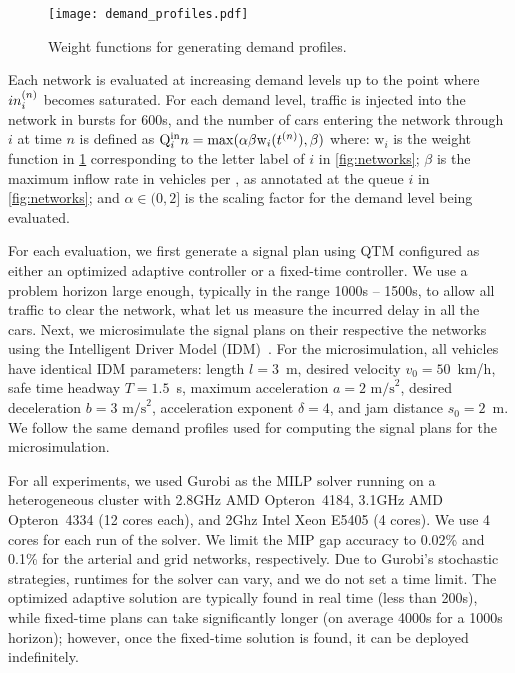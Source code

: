 \begin{figure}[t]
\centering
\texttt{[image: demand\_profiles.pdf]}
\caption{Weight functions for generating demand profiles.}
\label{fig:demand_profiles}
\end{figure}


%
%
Each network is evaluated at increasing demand levels up to the point where
$\inq{i}$ becomes saturated.
%
%
For each demand level, traffic is injected into the network in bursts for 600s,
and the number of cars entering the network through $i$ at time $n$ is defined
as $\QIN{i}{n} = \mathrm{max}(\alpha \beta \mathrm{w}_i(\tn[n]),\beta)$ where:
%
$\mathrm{w}_i$ is the weight function in \cref{fig:demand_profiles}
corresponding to the letter label of $i$ in \cref{fig:networks};
%
$\beta$ is the maximum inflow rate in vehicles per \DT, as annotated at the
queue $i$ in \cref{fig:networks}; and
%
$\alpha \in (0,2]$ is the scaling factor for the demand level being evaluated.


For each evaluation, we first generate a signal plan using QTM configured as
either an optimized adaptive controller or a fixed-time controller.
%
We use a problem horizon \TMAX large enough, typically in the range 1000s --
1500s, to allow all traffic to clear the network, what let us measure the
incurred delay in all the cars.
%
Next, we microsimulate the signal plans on their respective the networks using
the Intelligent Driver Model (IDM)~\cite{treiber2000congested}.
%
For the microsimulation, all vehicles have identical IDM parameters: length
$l=3$~m, desired velocity $v_0 = 50$~km/h, safe time headway $T=1.5$~s, maximum
acceleration $a=2 \text{ m/s}^2$, desired deceleration $b = 3 \text{ m/s}^2$,
acceleration exponent $\delta = 4$, and jam distance $s_0 = 2$~m.
%
We follow the same demand profiles used for computing the signal plans for the
microsimulation.


For all experiments, we used Gurobi as the MILP solver running on a
heterogeneous cluster with 2.8GHz AMD Opteron~4184, 3.1GHz AMD Opteron~4334 (12
cores each), and 2Ghz Intel Xeon E5405 (4 cores). We use 4 cores for each run of
the solver.
%
We limit the MIP gap accuracy to 0.02\% and 0.1\% for the arterial and grid
networks, respectively.
%
Due to Gurobi's stochastic strategies, runtimes for the solver can vary, and we
do not set a time limit.
%
The optimized adaptive solution are typically found in real time (less than
200s), while fixed-time plans can take significantly longer (on average 4000s
for a 1000s horizon); however, once the fixed-time solution is found, it can be
deployed indefinitely.
%




